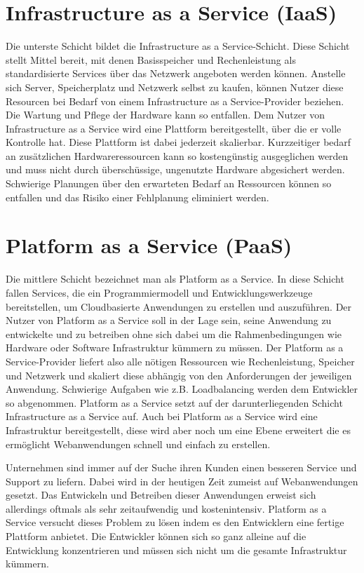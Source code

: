 \section{Infrastructure as a Service (IaaS)}
\label{sec:iaas}
Die unterste Schicht bildet die Infrastructure as a Service-Schicht.
\glqq Diese Schicht stellt Mittel bereit, mit denen Basisspeicher und Rechenleistung als standardisierte Services über das Netzwerk angeboten werden können.\grqq \cite[S. 30]{meinel_virtualisierung_2011}
Anstelle sich Server, Speicherplatz und Netzwerk selbst zu kaufen, können Nutzer diese Resourcen
bei Bedarf von einem Infrastructure as a Service-Provider beziehen. Die Wartung und Pflege der Hardware kann so entfallen.
Dem Nutzer von Infrastructure as a Service wird eine Plattform bereitgestellt, über die er volle Kontrolle hat. Diese Plattform ist dabei jederzeit skalierbar. Kurzzeitiger bedarf an zusätzlichen Hardwareressourcen kann so kostengünstig ausgeglichen werden und muss nicht durch überschüssige, ungenutzte Hardware abgesichert werden.
Schwierige Planungen über den erwarteten Bedarf an Ressourcen können so entfallen und das Risiko einer Fehlplanung eliminiert werden.

\section{Platform as a Service (PaaS)}
\label{sec:paas}
Die mittlere Schicht bezeichnet man als Platform as a Service. In diese Schicht fallen Services, die ein \glqq Programmiermodell und Entwicklungswerkzeuge bereitstellen, um Cloudbasierte Anwendungen zu erstellen und auszuführen.\grqq \cite{sommergut_faq_2014}
Der Nutzer von Platform as a Service soll in der Lage sein, seine Anwendung zu entwickelte und zu betreiben ohne sich dabei um die Rahmenbedingungen wie Hardware oder Software Infrastruktur kümmern zu müssen.
Der Platform as a Service-Provider liefert also alle nötigen Ressourcen wie Rechenleistung, Speicher und Netzwerk und skaliert diese abhängig von den Anforderungen der jeweiligen Anwendung.
Schwierige Aufgaben wie z.B. Loadbalancing werden dem Entwickler so abgenommen.
Platform as a Service setzt auf der darunterliegenden Schicht Infrastructure as a Service auf.
Auch bei Platform as a Service wird eine Infrastruktur bereitgestellt, diese wird aber noch um eine Ebene erweitert die es ermöglicht Webanwendungen schnell und einfach zu erstellen.

Unternehmen sind immer auf der Suche ihren Kunden einen besseren Service und Support zu liefern.
Dabei wird in der heutigen Zeit zumeist auf Webanwendungen gesetzt. Das Entwickeln und Betreiben dieser Anwendungen erweist sich allerdings oftmals als sehr zeitaufwendig und kostenintensiv.
Platform as a Service versucht dieses Problem zu lösen indem es den Entwicklern eine fertige Plattform anbietet. Die Entwickler können sich so ganz alleine auf die Entwicklung konzentrieren und müssen sich nicht um die gesamte Infrastruktur kümmern.

